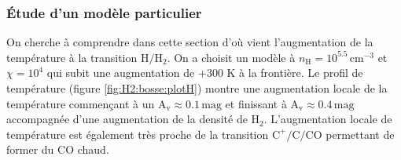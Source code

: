  

\subsubsection{Étude d'un modèle particulier}

On cherche à comprendre dans cette section d'où vient l'augmentation de la température à la transition $\mathrm{H}/\mathrm{H}_2$. On a choisit un modèle à $n_\mathrm{H} = 10^{5.5} \,\mathrm{cm}^{-3}$ et $\chi = 10^4$ qui subit une augmentation de $+300$ K à la frontière. Le profil de température (figure \ref{fig:H2:bosse:plotH}) montre une augmentation locale de la température commençant à un $\mathrm{A}_\mathrm{v} \approx 0.1 \,\mathrm{mag}$ et finissant à $\mathrm{A}_\mathrm{v} \approx 0.4 \,\mathrm{mag}$ accompagnée d'une augmentation de la densité de $\mathrm{H}_2$. L'augmentation locale de température est également très proche de la transition $\mathrm{C}^+/\mathrm{C}/\mathrm{CO}$ permettant de former du $\mathrm{CO}$ chaud. \newline 

